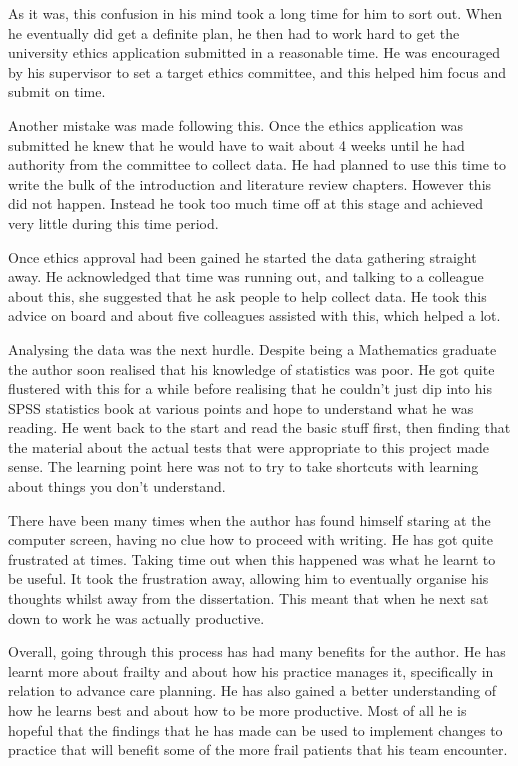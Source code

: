 \documentclass
[
	12pt,
	a4paper,
	oneside,
]{report}
\begin{document}
As it was, this confusion in his mind took a long time for him to sort out.
When he eventually did get a definite plan, he then had to work hard to get
the university ethics application submitted in a reasonable time. He was 
encouraged by his supervisor to set a target ethics committee, and this helped
him focus and submit on time. 

Another mistake was made following this. Once the ethics application was
submitted he knew that he would have to wait about 4 weeks until he had
authority from the committee to collect data. He had planned to use this time 
to write the bulk of the introduction and literature review chapters. However
this did not happen. Instead he took too much time off at this stage and
achieved very little during this time period. 

Once ethics approval had been gained he started the data gathering straight
away. He acknowledged that time was running out, and talking to a colleague 
about this, she suggested that he ask people to help collect data. He took
this advice on board and about five colleagues assisted with this, which
helped a lot.

Analysing the data was the next hurdle. Despite being a Mathematics graduate
the author soon realised that his knowledge of statistics was poor. He got 
quite flustered with this for a while before realising that he couldn't just
dip into his SPSS statistics book at various points and hope to understand
what he was reading. He went back to the start and read the basic stuff first,
then finding that the material about the actual tests that were appropriate to
this project made sense. The learning point here was not to try to take 
shortcuts with learning about things you don't understand.

There have been many times when the author has found himself staring at the 
computer screen, having no clue how to proceed with writing. He has got quite
frustrated at times. Taking time out when this happened was what he learnt to
be useful. It took the frustration away, allowing him to eventually organise
his thoughts whilst away from the dissertation. This meant that when he next 
sat down to work he was actually productive.

Overall, going through this process has had many benefits for the author. He 
has learnt more about frailty and about how his practice manages it,
specifically in relation to advance care planning. He has also gained a 
better understanding of how he learns best and about how to be more productive.
Most of all he is hopeful that the 
findings that he has made can be used to implement changes to practice that 
will benefit some of the more frail patients that his team encounter.
\end{document}
